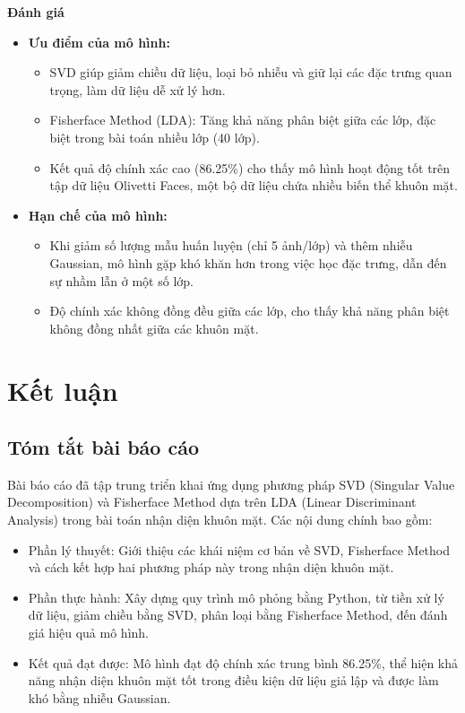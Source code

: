 \documentclass[a4paper,12pt]{extarticle}
\begin{document}
{\large \textbf{Đánh giá}}
\begin{itemize}
    \item \textbf{Ưu điểm của mô hình:}
    \begin{itemize}
        \item SVD giúp giảm chiều dữ liệu, loại bỏ nhiễu và giữ lại các đặc trưng quan trọng, làm dữ liệu dễ xử lý hơn.
        \item Fisherface Method (LDA): Tăng khả năng phân biệt giữa các lớp, đặc biệt trong bài toán nhiều lớp (40 lớp).
        \item Kết quả độ chính xác cao (86.25\%) cho thấy mô hình hoạt động tốt trên tập dữ liệu Olivetti Faces, một bộ dữ liệu chứa nhiều biến thể khuôn mặt.
    \end{itemize}
    \item \textbf{Hạn chế của mô hình:}
    \begin{itemize}
        \item Khi giảm số lượng mẫu huấn luyện (chỉ 5 ảnh/lớp) và thêm nhiễu Gaussian, mô hình gặp khó khăn hơn trong việc học đặc trưng, dẫn đến sự nhầm lẫn ở một số lớp.
        \item Độ chính xác không đồng đều giữa các lớp, cho thấy khả năng phân biệt không đồng nhất giữa các khuôn mặt.
    \end{itemize}
\end{itemize}

\section{Kết luận}
\subsection{Tóm tắt bài báo cáo}
Bài báo cáo đã tập trung triển khai ứng dụng phương pháp SVD (Singular Value Decomposition) và
Fisherface Method dựa trên LDA (Linear Discriminant Analysis) trong bài toán nhận diện khuôn mặt.
Các nội dung chính bao gồm:
\begin{itemize}
    \item Phần lý thuyết: Giới thiệu các khái niệm cơ bản về SVD, Fisherface Method và cách kết hợp hai phương pháp này trong nhận diện khuôn mặt.
    \item Phần thực hành: Xây dựng quy trình mô phỏng bằng Python, từ tiền xử lý dữ liệu, giảm chiều bằng SVD, phân loại bằng Fisherface Method, đến đánh giá hiệu quả mô hình.
    \item Kết quả đạt được: Mô hình đạt độ chính xác trung bình 86.25\%, thể hiện khả năng nhận diện khuôn mặt tốt trong điều kiện dữ liệu giả lập và được làm khó bằng nhiễu Gaussian.
\end{itemize}
\end{document}
